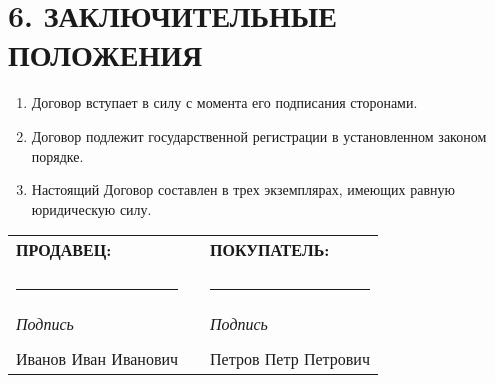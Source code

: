 \documentclass[12pt,a4paper]{article}
\begin{document}
\section*{6. ЗАКЛЮЧИТЕЛЬНЫЕ ПОЛОЖЕНИЯ}

\begin{enumerate}
\item Договор вступает в силу с момента его подписания сторонами.

\item Договор подлежит государственной регистрации в установленном законом порядке.

\item Настоящий Договор составлен в трех экземплярах, имеющих равную юридическую силу.
\end{enumerate}

\vspace{1cm}

\begin{center}
\begin{tabular}{p{8cm}p{1cm}p{8cm}}
\textbf{ПРОДАВЕЦ:} & & \textbf{ПОКУПАТЕЛЬ:} \\
\vspace{2cm} & & \vspace{2cm} \\
\rule{6cm}{0.5pt} & & \rule{6cm}{0.5pt} \\
\textit{Подпись} & & \textit{Подпись} \\
\vspace{0.5cm} & & \vspace{0.5cm} \\
Иванов Иван Иванович & & Петров Петр Петрович \\
\end{tabular}
\end{center}
\end{document}
